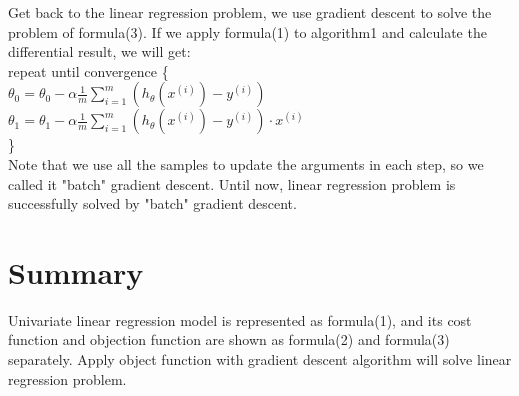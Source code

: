 \documentclass{article}
\begin{document}
Get back to the linear regression problem, we use gradient descent to solve the problem of formula(3). If we apply formula(1) to algorithm1 and calculate the differential result, we will get:\\
repeat until convergence \{\\
$\theta_0=\theta_0 - \alpha \frac{1}{m} \sum_{i=1}^{m}(h_\theta(x^{(i)})-y^{(i)})$\\
$\theta_1=\theta_1 - \alpha \frac{1}{m} \sum_{i=1}^{m}(h_\theta(x^{(i)})-y^{(i)}) \cdot x^{(i)}$\\
\}\\
Note that we use all the samples to update the arguments in each step, so we called it "batch" gradient descent. Until now, linear regression problem is successfully solved by "batch" gradient descent.

\section{Summary}
Univariate linear regression model is represented as formula(1), and its cost function and objection function are shown as formula(2) and formula(3) separately. Apply object function with gradient descent algorithm will solve linear regression problem.
 
\end{document}

